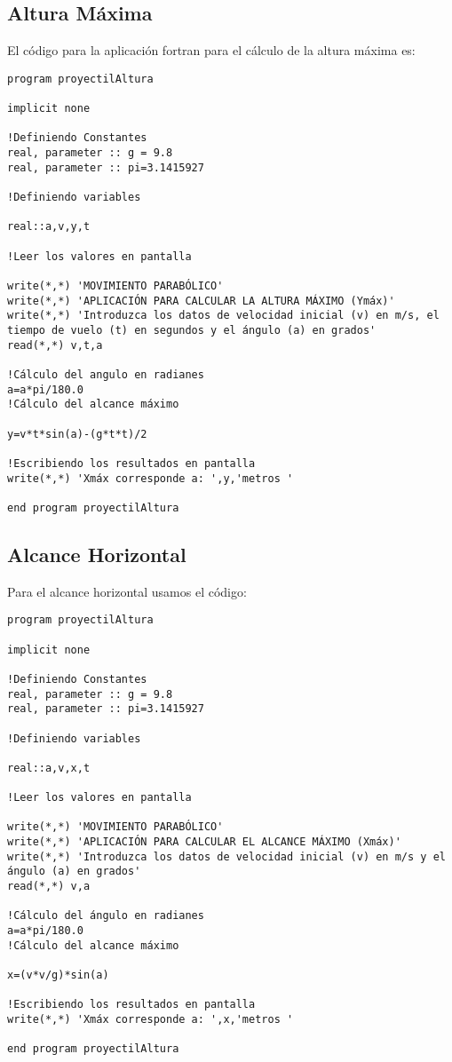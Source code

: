 \documentclass[12pt,a4paper]{article}
\begin{document}
\subsection{Altura Máxima}
El código para la aplicación fortran para el cálculo de la altura máxima es:
\begin{verbatim}
program proyectilAltura

implicit none

!Definiendo Constantes
real, parameter :: g = 9.8
real, parameter :: pi=3.1415927

!Definiendo variables

real::a,v,y,t

!Leer los valores en pantalla

write(*,*) 'MOVIMIENTO PARABÓLICO'
write(*,*) 'APLICACIÓN PARA CALCULAR LA ALTURA MÁXIMO (Ymáx)'
write(*,*) 'Introduzca los datos de velocidad inicial (v) en m/s, el tiempo de vuelo (t) en segundos y el ángulo (a) en grados'
read(*,*) v,t,a

!Cálculo del angulo en radianes
a=a*pi/180.0
!Cálculo del alcance máximo

y=v*t*sin(a)-(g*t*t)/2

!Escribiendo los resultados en pantalla
write(*,*) 'Xmáx corresponde a: ',y,'metros '

end program proyectilAltura

\end{verbatim}
\subsection{Alcance Horizontal}
Para el alcance horizontal usamos el código:
\begin{verbatim}
program proyectilAltura

implicit none

!Definiendo Constantes
real, parameter :: g = 9.8
real, parameter :: pi=3.1415927

!Definiendo variables

real::a,v,x,t

!Leer los valores en pantalla

write(*,*) 'MOVIMIENTO PARABÓLICO'
write(*,*) 'APLICACIÓN PARA CALCULAR EL ALCANCE MÁXIMO (Xmáx)'
write(*,*) 'Introduzca los datos de velocidad inicial (v) en m/s y el ángulo (a) en grados'
read(*,*) v,a

!Cálculo del ángulo en radianes
a=a*pi/180.0
!Cálculo del alcance máximo

x=(v*v/g)*sin(a)

!Escribiendo los resultados en pantalla
write(*,*) 'Xmáx corresponde a: ',x,'metros '

end program proyectilAltura

\end{verbatim}
\end{document}
